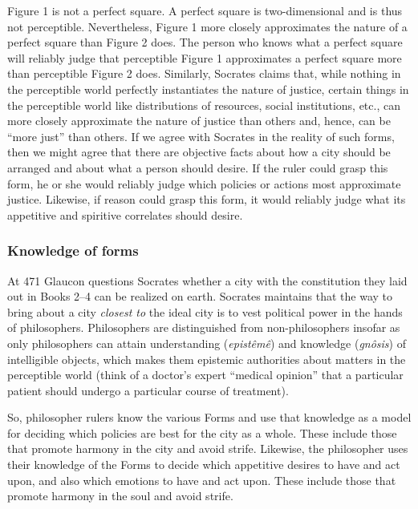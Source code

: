 \documentclass[oneside]{article}
\begin{document}
Figure 1 is not a perfect square. A perfect square is two-dimensional and is thus not perceptible.  Nevertheless, Figure 1 more closely approximates the nature of a perfect square than Figure 2 does. The person who knows what a perfect square will reliably judge that perceptible Figure 1 approximates a perfect square more than perceptible Figure 2 does. Similarly, Socrates claims that, while nothing in the perceptible world perfectly instantiates the nature of justice, certain things in the perceptible world like distributions of resources, social institutions, etc., can more closely approximate the nature of justice than others and, hence, can be ``more just'' than others. If we agree with Socrates in the reality of such forms, then we might agree that there are objective facts about how a city should be arranged and about what a person should desire. If the ruler could grasp this form, he or she would reliably judge which policies or actions most approximate justice. Likewise, if reason could grasp this form, it would reliably judge what its appetitive and spiritive correlates should desire. 



\subsubsection*{Knowledge of forms }

At 471 Glaucon questions Socrates whether a city with the constitution they laid out in Books 2--4 can be realized on earth. Socrates maintains that the way to bring about a city \emph{closest to} the ideal city is to vest political power in the hands of philosophers. Philosophers are distinguished from non-philosophers insofar as only philosophers can attain understanding (\emph{epist\^{e}m\^{e}}) and knowledge (\emph{gn\^{o}sis}) of intelligible objects, which makes them epistemic authorities about matters in the perceptible world (think of a doctor's expert ``medical opinion'' that a particular patient should undergo a particular course of treatment). 

So, philosopher rulers know the various Forms and use that knowledge as a model for deciding which policies are best for the city as a whole. These include those that promote harmony in the city and avoid strife. Likewise, the philosopher uses their knowledge of the Forms to decide which appetitive desires to have and act upon, and also which emotions to have and act upon. These include those that promote harmony in the soul and avoid strife. 
\end{document}
